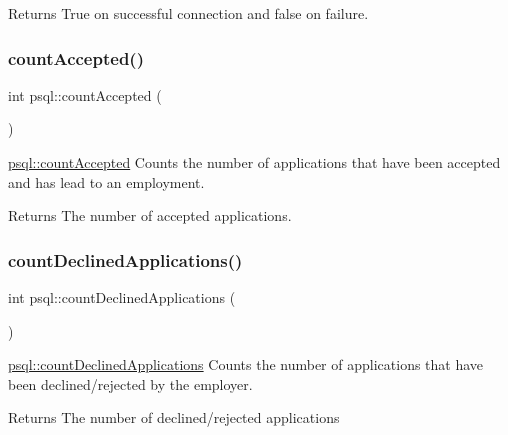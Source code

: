 \begin{DoxyReturn}{Returns}
True on successful connection and false on failure. 
\end{DoxyReturn}
\mbox{\label{classpsql_abc598b3a1783194380b9ab22d9341357}} 
\subsubsection{\texorpdfstring{count\+Accepted()}{countAccepted()}}
{\footnotesize\ttfamily int psql\+::count\+Accepted (\begin{DoxyParamCaption}{ }\end{DoxyParamCaption})}



\mbox{\hyperlink{classpsql_abc598b3a1783194380b9ab22d9341357}{psql\+::count\+Accepted}} Counts the number of applications that have been accepted and has lead to an employment. 

\begin{DoxyReturn}{Returns}
The number of accepted applications. 
\end{DoxyReturn}
\mbox{\label{classpsql_accf6323167fbe0c622b3c14a6e454195}} 
\subsubsection{\texorpdfstring{count\+Declined\+Applications()}{countDeclinedApplications()}}
{\footnotesize\ttfamily int psql\+::count\+Declined\+Applications (\begin{DoxyParamCaption}{ }\end{DoxyParamCaption})}



\mbox{\hyperlink{classpsql_accf6323167fbe0c622b3c14a6e454195}{psql\+::count\+Declined\+Applications}} Counts the number of applications that have been declined/rejected by the employer. 

\begin{DoxyReturn}{Returns}
The number of declined/rejected applications 
\end{DoxyReturn}
\mbox{\label{classpsql_a5d382c01e6d7957e628ade338ddaf70b}} 
